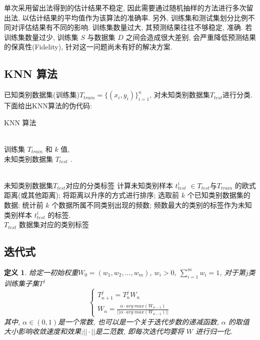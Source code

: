 \documentclass[11pt]{article}
\newtheorem{defn}{定义}[section]
\numberwithin{equation}{section}
\begin{document}
单次采用留出法得到的估计结果不稳定\cite{机器学习原理}, 因此需要通过随机抽样的方法进行多次留出法, 以估计结果的平均值作为该算法的准确率. 另外, 训练集和测试集划分比例不同对评估结果有不同的影响. 训练集数量过大, 其预测结果往往不够稳定, 准确. 若训练集数量过少, 训练集 $S$ 与数据集 $D$ 之间会造成很大差别, 会严重降低预测结果的保真性(Fidelity), 针对这一问题尚未有好的解决方案.


\subsection{KNN 算法}
已知类别数据集(训练集)$T_{train} = \{(x_{i}, y_{i})\}_{i=1}^{n}$, 对未知类别数据集$T_{test}$进行分类. 下面给出KNN算法\cite{knn}的伪代码:

\begin{algorithm}[H]   
\caption{\quad KNN 算法}   
\begin{algorithmic}[1] %
\REQUIRE  ~~\\ %
训练集 $T_{train}$ 和 $k$ 值,\\  
未知类别数据集 $T_{test}$ .

\ENSURE  ~~\\ %
未知类别数据集$T_{test}$对应的分类标签
\STATE 计算未知类别样本 $t^{i}_{test}$ $\in T_{test}$与$T_{train}$ 的欧式距离(或其他距离);   
\STATE 将距离以升序的方式进行排序;   
\STATE 选取前 $k$ 个已知类别数据集的数据;   
\STATE 统计前 $k$ 个数据所属不同类别出现的频数;   
\STATE 频数最大的类别的标签作为未知类别样本 $t^{i}_{test}$ 的标签.
\ENDFOR
\RETURN \\
$T_{test}$ 数据集对应的类别标签
\end{algorithmic}  
\end{algorithm}  


\subsection{迭代式}
\begin{defn}
给定一初始权重$W_{0} = (w_{1}, w_{2}, ..., w_{m})$, $w_{i}>0 $, $\sum_{i=1}^{m}w_{i} = 1$, 对于第$j$类训练集子集$T^{j}$
\begin{equation}
\left\{\begin{array}{c}
T^{j}_{n+1}= T^{j}_{n}W_{n}  \\
W_{n} = \frac{\alpha \cdot arg ~ max(W_{n-1})}{||\alpha \cdot arg ~ max(W_{n-1})||}
\end{array}\right.
\end{equation}
其中, $\alpha \in(0,1)$是一个常数, 也可以是一个关于迭代步数的递减函数, $\alpha$ 的取值大小影响收敛速度和效果;$||\cdot||$是二范数, 即每次迭代均要将 $W$ 进行归一化.
\end{defn}
\end{document}
